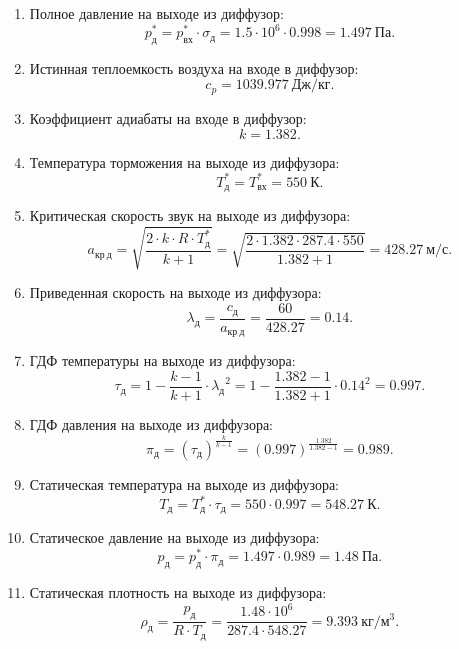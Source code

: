 \documentclass[a4paper,10pt]{article}
\begin{document}
    
    \begin{enumerate}
    	\item Полное давление на выходе из диффузор:
    	\[
    		p_д^* = p_{вх}^* \cdot \sigma_д = 1.5 \cdot 10^6 \cdot 0.998 = 
    		1.497\ Па.
    	\]

    	\item Истинная теплоемкость воздуха на входе в диффузор:
    	\[
    		c_p = 1039.977\ Дж/кг.
    	\]

    	\item Коэффициент адиабаты на входе в диффузор:
    	\[
    		k = 1.382.
    	\]

    	\item Температура торможения на выходе из диффузора:
    	\[
    		T_{д}^* = T_{вх}^* = 550\ К.
    	\]

    	\item Критическая скорость звук на выходе из диффузора:
    	\[
    		a_{кр\ д} = \sqrt{ \frac{2 \cdot k \cdot R \cdot T_{д}^*}{k + 1} } =
    		\sqrt{ \frac{
    				2 \cdot 1.382 \cdot 287.4 \cdot 550
    				}{
    				1.382 + 1
    		} } =
    		428.27\ м/с.
    	\]

    	\item Приведенная скорость на выходе из диффузора:
    	\[
    		\lambda_д = \frac{c_д}{a_{кр\ д}} = \frac{60}{428.27} = 
    		0.14.
    	\]

    	\item ГДФ температуры на выходе из диффузора:
    	\[
    		\tau_д =  1 - \frac{k - 1}{k + 1} \cdot {\lambda_д}^2  =  
    		1 - \frac{1.382 - 1}{1.382 + 1} 
    		\cdot {0.14}^2  = 
    		0.997.
    	\]

    	\item ГДФ давления на выходе из диффузора:
    	\[
    		\pi_д = \left( \tau_д  \right) ^ \frac{k}{k -1} = 
    		\left( 
    			0.997  
    			\right) ^ \frac{1.382}{1.382 -1} = 
    		0.989.
    	\]

    	\item Статическая температура на выходе из диффузора:
    	\[
    		T_{д} = T_{д}^* \cdot \tau_д = 550 \cdot 0.997 = 548.27\ К.
    	\]

    	\item Статическое давление на выходе из диффузора:
    	\[
    		p_{д} = p_д^* \cdot \pi_д = 1.497 \cdot 0.989 = 
    		1.48\ Па.
    	\]

    	\item Статическая плотность на выходе из диффузора:
    	\[
    		\rho_д = \frac{p_д}{R \cdot T_д} = 
    		\frac{1.48 \cdot 10^6}{ 287.4 \cdot 548.27} =
    		9.393\ кг/м^3.
    	\]


\end{enumerate}
\end{document}
